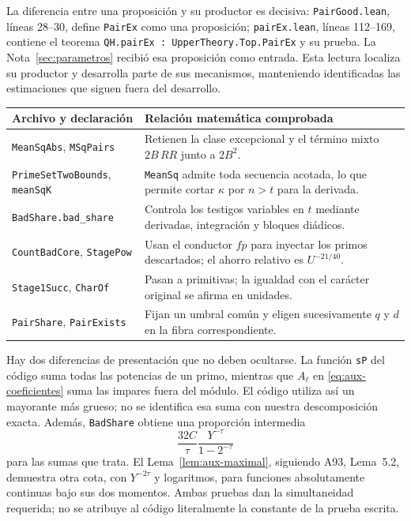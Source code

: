 La diferencia entre una proposición y su productor es decisiva:
\texttt{PairGood.lean}, líneas 28--30, define \texttt{PairEx}
como una proposición; \texttt{pairEx.lean}, líneas 112--169,
contiene el teorema \texttt{QH.pairEx : UpperTheory.Top.PairEx}
y su prueba. La Nota~\ref{sec:parametros} recibió esa proposición
como entrada. Esta lectura localiza su productor y desarrolla parte
de sus mecanismos, manteniendo identificadas las estimaciones que
siguen fuera del desarrollo.

\begin{center}
\small
\begin{tabularx}{\textwidth}{@{}p{}X@{}}
\toprule
Archivo y declaración & Relación matemática comprobada \\
\midrule
\texttt{MeanSqAbs}, \texttt{MSqPairs} &
Retienen la clase excepcional y el término mixto
$2B\,RR$ junto a $2B^2$. \\
\texttt{PrimeSetTwoBounds}, \texttt{meanSqK} &
\texttt{MeanSq} admite toda secuencia acotada, lo que permite
cortar $\kappa$ por $n>t$ para la derivada. \\
\texttt{BadShare.bad\_share} &
Controla los testigos variables en $t$ mediante derivadas,
integración y bloques diádicos. \\
\texttt{CountBadCore}, \texttt{StagePow} &
Usan el conductor $fp$ para inyectar los primos descartados;
el ahorro relativo es $U^{-21/40}$. \\
\texttt{Stage1Succ}, \texttt{CharOf} &
Pasan a primitivas; la igualdad con el carácter original
se afirma en unidades. \\
\texttt{PairShare}, \texttt{PairExists} &
Fijan un umbral común y eligen sucesivamente $q$ y $d$
en la fibra correspondiente. \\
\bottomrule
\end{tabularx}
\end{center}

Hay dos diferencias de presentación que no deben ocultarse.
La función \texttt{sP} del código suma todas las potencias de un primo,
mientras que $A_\ell$ en \eqref{eq:aux-coeficientes} suma las impares
fuera del módulo. El código utiliza así un mayorante más grueso;
no se identifica esa suma con nuestra descomposición exacta.
Además, \texttt{BadShare} obtiene una proporción intermedia
\begin{equation}
 \frac{32C}{\tau}\frac{Y^{-\tau}}{1-2^{-\tau}}
 \label{eq:aux-diadas-lean}
\end{equation}
para las sumas que trata. El Lema~\ref{lem:aux-maximal}, siguiendo
A93, Lema~5.2, demuestra otra cota, con $Y^{-2\tau}$ y logaritmos,
para funciones absolutamente continuas bajo sus dos momentos.
Ambas pruebas dan la simultaneidad requerida; no se atribuye al
código literalmente la constante de la prueba escrita.

